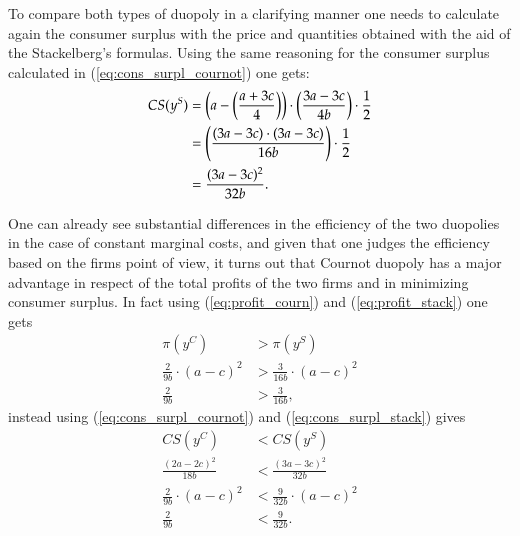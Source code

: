 \documentclass[12pt]{article}
\numberwithin{equation}{subsection}
\begin{document}
To compare both types of duopoly in a clarifying manner one needs to calculate again the consumer surplus with the price and quantities obtained with the aid of the Stackelberg's formulas. Using the same reasoning for the consumer surplus calculated in (\ref{eq:cons_surpl_cournot}) one gets: \begin{align}
\label{eq:cons_surpl_stack}
CS(y^S) & = \left(a - \left(\frac{a + 3c}{4}\right)\right) \cdot \left(\frac{3a - 3c}{4b}\right) \cdot \frac{1}{2} \notag \\
& = \left(\frac{(3a - 3c) \cdot (3a - 3c)}{16b}\right) \cdot \frac{1}{2} \notag \\
& = \frac{(3a - 3c)^2}{32b}.
\end{align}

One can already see substantial differences in the efficiency of the two duopolies in the case of constant marginal costs, and given that one judges the efficiency based on the firms point of view, it turns out that Cournot duopoly has a major advantage in respect of the total profits of the two firms and in minimizing consumer surplus. In fact using (\ref{eq:profit_courn}) and (\ref{eq:profit_stack}) one gets \begin{align*}
\pi(y^C) &> \pi(y^S)\\
\frac{2}{9b} \cdot (a - c)^2 &> \frac{3}{16b} \cdot (a - c)^2\\
\frac{2}{9b} &> \frac{3}{16b},
\end{align*}
instead using (\ref{eq:cons_surpl_cournot}) and (\ref{eq:cons_surpl_stack}) gives \begin{align*}
CS(y^C) &< CS(y^S)\\
\frac{(2a - 2c)^2}{18b} &< \frac{(3a - 3c)^2}{32b}\\
\frac{2}{9b} \cdot (a-c)^2 &<\frac{9}{32b} \cdot (a-c)^2\\
\frac{2}{9b} & < \frac{9}{32b}.
\end{align*}
\end{document}
